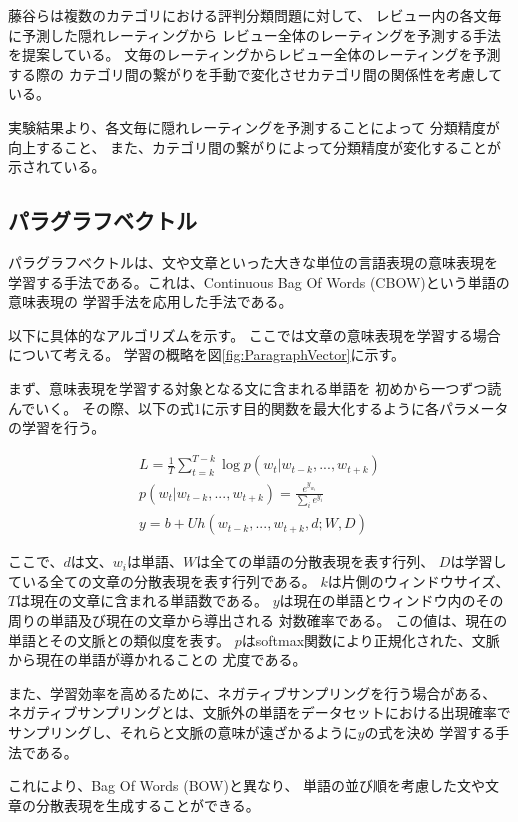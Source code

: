 \documentclass{ttithesis}
\begin{document}
藤谷ら\cite{fujitani15}は複数のカテゴリにおける評判分類問題に対して、
レビュー内の各文毎に予測した隠れレーティングから
レビュー全体のレーティングを予測する手法を提案している。
文毎のレーティングからレビュー全体のレーティングを予測する際の
カテゴリ間の繋がりを手動で変化させカテゴリ間の関係性を考慮している。

実験結果より、各文毎に隠れレーティングを予測することによって
分類精度が向上すること、
また、カテゴリ間の繋がりによって分類精度が変化することが示されている。


\subsection{パラグラフベクトル}

パラグラフベクトルは、文や文章といった大きな単位の言語表現の意味表現を
学習する手法である。これは、Continuous Bag Of Words
(CBOW)という単語の意味表現の 学習手法を応用した手法である。

以下に具体的なアルゴリズムを示す。
ここでは文章の意味表現を学習する場合について考える。
学習の概略を図\ref{fig:ParagraphVector}に示す。

まず、意味表現を学習する対象となる文に含まれる単語を
初めから一つずつ読んでいく。
その際、以下の式1に示す目的関数を最大化するように各パラメータの学習を行う。

\begin{gather}
  L = \frac{1}{T} \sum^{T - k}_{t = k} \log p(w_t | w_{t-k}, ..., w_{t+k}) \\
  p(w_t | w_{t-k}, ..., w_{t+k}) = \frac{e^{y_{w_t}}}{\sum_i e^{y_i}} \\
  y = b + Uh(w_{t-k}, ..., w_{t+k}, d; W, D)
\end{gather}

ここで、$d$は文、$w_i$は単語、$W$は全ての単語の分散表現を表す行列、
$D$は学習している全ての文章の分散表現を表す行列である。
$k$は片側のウィンドウサイズ、
$T$は現在の文章に含まれる単語数である。
$y$は現在の単語とウィンドウ内のその周りの単語及び現在の文章から導出される
対数確率である。 この値は、現在の単語とその文脈との類似度を表す。
$p$はsoftmax関数により正規化された、文脈から現在の単語が導かれることの
尤度である。

また、学習効率を高めるために、ネガティブサンプリングを行う場合がある、
ネガティブサンプリングとは、文脈外の単語をデータセットにおける出現確率で
サンプリングし、それらと文脈の意味が遠ざかるように$y$の式を決め
学習する手法である。

これにより、Bag Of Words (BOW)と異なり、
単語の並び順を考慮した文や文章の分散表現を生成することができる。
\end{document}
